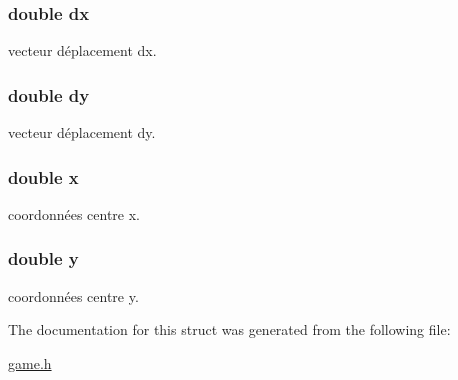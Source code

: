 \subsubsection[{\texorpdfstring{dx}{dx}}]{\setlength{\rightskip}{0pt plus 5cm}double dx}\hypertarget{struct_shot_a229d11aff11a7482259d1296b9b70b8a}{}\label{struct_shot_a229d11aff11a7482259d1296b9b70b8a}
vecteur déplacement dx. 
\subsubsection[{\texorpdfstring{dy}{dy}}]{\setlength{\rightskip}{0pt plus 5cm}double dy}\hypertarget{struct_shot_a9deb6f886b19d50e714d890c3c268efc}{}\label{struct_shot_a9deb6f886b19d50e714d890c3c268efc}
vecteur déplacement dy. 
\subsubsection[{\texorpdfstring{x}{x}}]{\setlength{\rightskip}{0pt plus 5cm}double x}\hypertarget{struct_shot_af88b946fb90d5f08b5fb740c70e98c10}{}\label{struct_shot_af88b946fb90d5f08b5fb740c70e98c10}
coordonnées centre x. 
\subsubsection[{\texorpdfstring{y}{y}}]{\setlength{\rightskip}{0pt plus 5cm}double y}\hypertarget{struct_shot_ab927965981178aa1fba979a37168db2a}{}\label{struct_shot_ab927965981178aa1fba979a37168db2a}
coordonnées centre y. 

The documentation for this struct was generated from the following file\+:\begin{DoxyCompactItemize}
\item 
\hyperlink{game_8h}{game.\+h}\end{DoxyCompactItemize}
